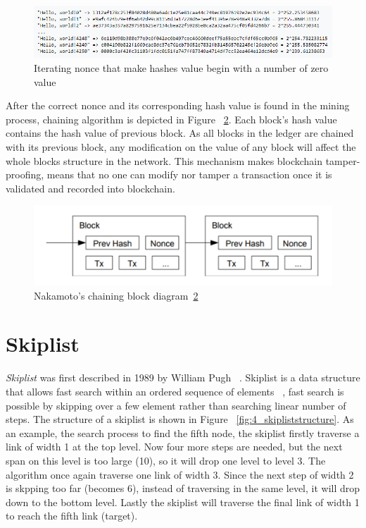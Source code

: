 \begin{figure}[H]
	\begin{center}
		\includegraphics[width=1.0\textwidth]{figures/proofofwork.png}
		\caption{Iterating nonce that make hashes value begin with a number of zero value~\cite{proofofwork}} 
		\label{fig:2_proofofwork}
	\end{center}
\end{figure}

After the correct nonce and its corresponding hash value is found in the mining process, chaining algorithm is depicted in Figure ~\ref{fig:3_blockchainning}. Each block's hash value contains the hash value of previous block. As all blocks in the ledger are chained with its previous block, any modification on the value of any block will affect the whole blocks structure in the network. This mechanism makes blockchain tamper-proofing, means that no one can modify nor tamper a transaction once it is validated and recorded into blockchain.

\begin{figure}[H]
	\begin{center}
		\includegraphics[width=1.0\textwidth]{figures/block-chainning.png}
		\caption{Nakamoto's chaining block diagram~\ref{fig:3_blockchainning}} 
		\label{fig:3_blockchainning}
	\end{center}
\end{figure}

\section{Skiplist}
\label{sec:3_skiplist}

\textit{Skiplist} was first described in 1989 by William Pugh ~\cite{skiplistOriginate}. Skiplist is a data structure that allows fast search within an ordered sequence of elements ~\cite{wiki:skiplist}, fast search is possible by skipping over a few element rather than searching linear number of steps. The structure of a skiplist is shown in Figure ~\ref{fig:4_skipliststructure}. As an example, the search process to find the fifth node, the skiplist firstly traverse a link of width 1 at the top level. Now four more steps are needed, but the next span on this level is too large (10), so it will drop one level to level 3. The algorithm once again traverse one link of width 3. Since the next step of width 2 is skpping too far (becomes 6), instead of traversing in the same level, it will drop down to the bottom level. Lastly the skiplist will traverse the final link of width 1 to reach the fifth link (target).


